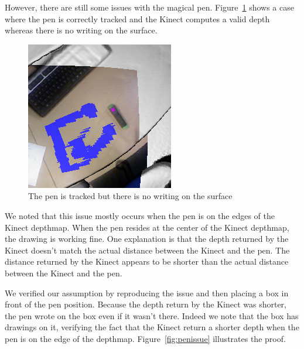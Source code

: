 \documentclass[12pt, twoside]{article}
\begin{document}
However, there are still some issues with the magical pen. Figure~\ref{fig:nowrite} shows a case where the pen is correctly tracked and the Kinect computes a valid depth whereas there is no writing on the surface.

\begin{figure}[!h]
  \centering
  \includegraphics[scale=0.4]{NoWrite.png}
  \caption{\label{fig:nowrite} The pen is tracked but there is no writing on the surface}
\end{figure}

We noted that this issue mostly occurs when the pen is on the edges of the Kinect depthmap. When the pen resides at the center of the Kinect depthmap, the drawing is working fine. One explanation is that the depth returned by the Kinect doesn't match the actual distance between the Kinect and the pen. The distance returned by the Kinect appears to be shorter than the actual distance between the Kinect and the pen.

We verified our assumption by reproducing the issue and then placing a box in front of the pen position. Because the depth return by the Kinect was shorter, the pen wrote on the box even if it wasn't there. Indeed we note that the box has drawings on it, verifying the fact that the Kinect return a shorter depth when the pen is on the edge of the depthmap. Figure~\ref{fig:penissue} illustrates the proof.
\end{document}
